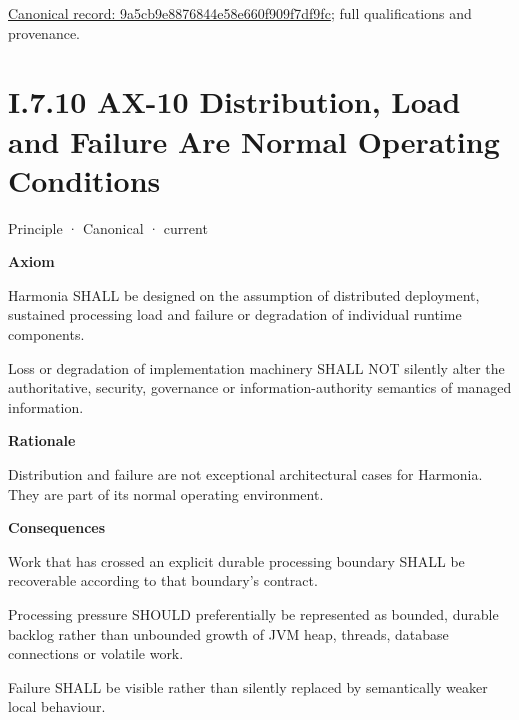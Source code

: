 {\footnotesize \href{../../../../../../../../continuum/motivation/principle/9a5cb9e8876844e58e660f909f7df9fc.md}{Canonical record: 9a5cb9e8876844e58e660f909f7df9fc}; full qualifications and provenance.}\par
\section*{I.7.10 AX-10 Distribution, Load and Failure Are Normal Operating Conditions}
\label{navigation:I.7.10}

\label{element:0d9673833eb840eab03804aa076c1b0c}
{\small Principle · Canonical · current}\par

\par\medskip\textbf{Axiom}\par


Harmonia SHALL be designed on the assumption of distributed deployment,
sustained processing load and failure or degradation of individual
runtime components.



Loss or degradation of implementation machinery SHALL NOT silently alter
the authoritative, security, governance or information-authority
semantics of managed information.



\par\medskip\textbf{Rationale}\par


Distribution and failure are not exceptional architectural cases for
Harmonia. They are part of its normal operating environment.



\par\medskip\textbf{Consequences}\par


Work that has crossed an explicit durable processing boundary SHALL be
recoverable according to that boundary's contract.



Processing pressure SHOULD preferentially be represented as bounded,
durable backlog rather than unbounded growth of JVM heap, threads,
database connections or volatile work.



Failure SHALL be visible rather than silently replaced by semantically
weaker local behaviour.



